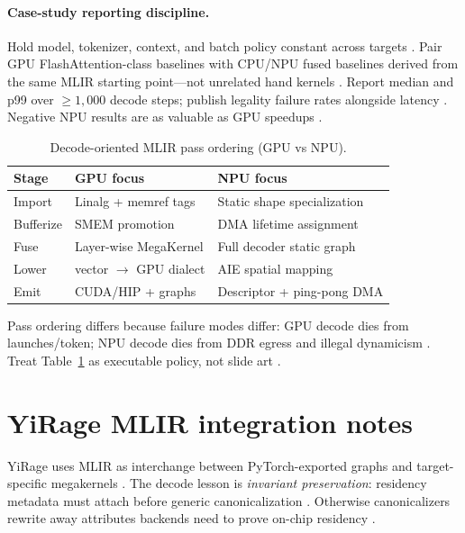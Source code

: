 \paragraph{Case-study reporting discipline.} Hold model, tokenizer, context, and batch policy constant across targets \citep{patel2025llminference}. Pair GPU FlashAttention-class baselines with CPU/NPU fused baselines derived from the same MLIR starting point---not unrelated hand kernels \citep{dao2022flashattention,dao2023flashdecoding,yirage2026}. Report median and p99 over ${\geq}1{,}000$ decode steps; publish legality failure rates alongside latency \citep{memoryfloor2026,taxbreak2026}. Negative NPU results are as valuable as GPU speedups \citep{amd2024aie,amd2024xdna}.

\begin{table}[t]
\centering
\caption{Decode-oriented MLIR pass ordering (GPU vs NPU).}
\label{tab:mlir_pass_order_mid}
\begin{tabular}{lll}
\toprule
\textbf{Stage} & \textbf{GPU focus} & \textbf{NPU focus} \\
\midrule
Import & Linalg + memref tags & Static shape specialization \\
Bufferize & SMEM promotion & DMA lifetime assignment \\
Fuse & Layer-wise MegaKernel & Full decoder static graph \\
Lower & vector $\rightarrow$ GPU dialect & AIE spatial mapping \\
Emit & CUDA/HIP + graphs & Descriptor + ping-pong DMA \\
\bottomrule
\end{tabular}
\end{table}

Pass ordering differs because failure modes differ: GPU decode dies from launches/token; NPU decode dies from DDR egress and illegal dynamicism \citep{taxbreak2026,liu2024deepseekv3,amd2024xdna}. Treat Table~\ref{tab:mlir_pass_order_mid} as executable policy, not slide art \citep{yirage2026,chen2020compilerbasedhardw}.

\section{YiRage MLIR integration notes}
\label{sec:ch14_yirage_mlir}

YiRage uses MLIR as interchange between PyTorch-exported graphs and target-specific megakernels \citep{yirage2026}. The decode lesson is \emph{invariant preservation}: residency metadata must attach before generic canonicalization \citep{chen2020compilerbasedhardw,amd2024xdna}. Otherwise canonicalizers rewrite away attributes backends need to prove on-chip residency \citep{yirage2026,nvidia2022hopper}.

